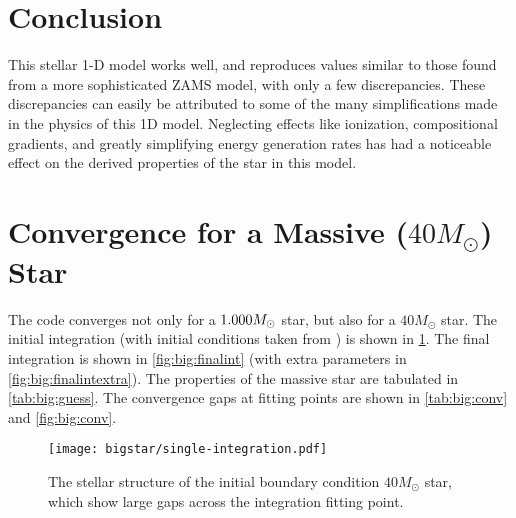 \documentclass[10pt]{article}
\begin{document}
\begin{table}[htbp]
\begin{center}
\label{tab:compare}

\end{center}
\end{table}

\section{Conclusion} \label{sec:conclusion}
This stellar 1-D model works well, and reproduces values similar to those found from a more sophisticated ZAMS model, with only a few discrepancies. These discrepancies can easily be attributed to some of the many simplifications made in the physics of this 1D model. Neglecting effects like ionization, compositional gradients, and greatly simplifying energy generation rates has had a noticeable effect on the derived properties of the star in this model.




\clearpage
\appendix

\section{Convergence for a Massive ($40 M_\odot$) Star}
The code converges not only for a $1.000 M_\odot$ star, but also for a $40 M_\odot$ star. The initial integration (with initial conditions taken from \citet{hansen2004stellar}) is shown in \cref{fig:big:firstint}. The final integration is shown in \cref{fig:big:finalint} (with extra parameters in \cref{fig:big:finalintextra}). The properties of the massive star are tabulated in \cref{tab:big:guess}. The convergence gaps at fitting points are shown in \cref{tab:big:conv} and \cref{fig:big:conv}. 

 \begin{figure}[htbp]
    \centering
    \texttt{[image: bigstar/single-integration.pdf]}
    \caption[Initial Integration]{The stellar structure of the initial boundary condition $40 M_\odot$ star, which show large gaps across the integration fitting point.}
    \label{fig:big:firstint}
 \end{figure}
 
 \begin{table}[htbp]
\begin{center}
\label{tab:big:guess}

\end{center}
\end{table}
 
\end{document}
